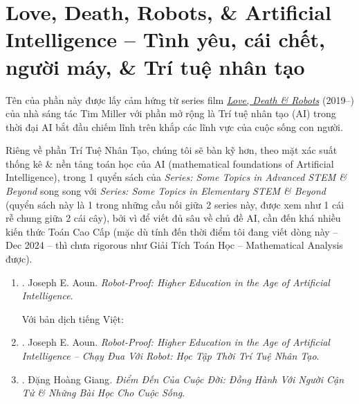 \documentclass[12pt,oneside]{book}
\begin{document}
\section{Love, Death, Robots, \& Artificial Intelligence -- Tình yêu, cái chết, người máy, \& Trí tuệ nhân tạo}
Tên của phần này được lấy cảm hứng từ series film \href{https://www.imdb.com/title/tt9561862}{\it Love, Death \& Robots} (2019--) của nhà sáng tác {\sc Tim Miller} với phần mở rộng là Trí tuệ nhân tạo (AI) trong thời đại AI bắt đầu chiếm lĩnh trên khắp các lĩnh vực của cuộc sống con người.

Riêng về phần Trí Tuệ Nhân Tạo, chúng tôi sẽ bàn kỹ hơn, theo mặt xác suất thống kê \& nền tảng toán học của AI (mathematical foundations of Artificial Intelligence), trong 1 quyển sách của {\it Series: Some Topics in Advanced STEM \& Beyond} song song với {\it Series: Some Topics in Elementary STEM \& Beyond} (quyển sách này là 1 trong những cầu nối giữa 2 series này, được xem như 1 cái rễ chung giữa 2 cái cây), bởi vì để viết đủ sâu về chủ đề AI, cần đến khá nhiều kiến thức Toán Cao Cấp (mặc dù tính đến thời điểm tôi đang viết dòng này -- Dec 2024 -- thì chưa rigorous như Giải Tích Toán Học -- Mathematical Analysis được).

\begin{enumerate}
	\item \cite{Aoun_robot-proof}. {\sc Joseph E. Aoun}. {\it Robot-Proof: Higher Education in the Age of Artificial Intelligence}.
	
	Với bản dịch tiếng Việt:
	\item \cite{Aoun_robot-proof_VN}. {\sc Joseph E. Aoun}. {\it Robot-Proof: Higher Education in the Age of Artificial Intelligence -- Chạy Đua Với Robot: Học Tập Thời Trí Tuệ Nhân Tạo}.
	\item \cite{Giang_death}. {\sc Đặng Hoàng Giang}. {\it Điểm Đến Của Cuộc Đời: Đồng Hành Với Người Cận Tử \& Những Bài Học Cho Cuộc Sống}.
\end{enumerate}
\end{document}

